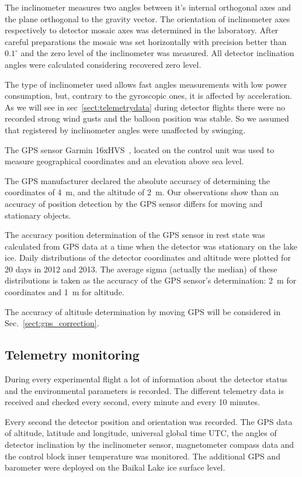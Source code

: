 \documentclass[final,5p,times,twocolumn]{elsarticle}
\begin{document}
The inclinometer measures two angles between it's internal orthogonal axes and the plane orthogonal to the gravity vector. The orientation of inclinometer axes respectively to detector mosaic axes was determined in the laboratory. After careful preparations the mosaic was set horizontally with precision better than $0.1^\circ$ and the zero level of the inclinometer was measured. All detector inclination angles were calculated considering recovered zero level.

The type of inclinometer used allows fast angles measurements with low power consumption, but, contrary to the gyroscopic ones, it is affected by acceleration. As we will see in sec~\ref{sect:telemetrydata} during detector flights there were no recorded strong wind gusts and the balloon position was stable. So we assumed that  registered by inclinometer angles were unaffected by swinging.

The GPS sensor Garmin 16xHVS~\cite{GPS-module-specs}, located on the control unit was used to measure geographical coordinates and an elevation above sea level. 

The GPS manufacturer declared the absolute accuracy of determining the coordinates of 4~m, and the altitude of 2~m. Our observations show than an accuracy of position detection by the GPS sensor differs for moving and stationary objects. 

The accuracy position determination of the GPS sensor in rest state was calculated from GPS data at a time when the detector was stationary on the lake ice. Daily distributions of the detector coordinates and altitude were plotted for 20 days in 2012 and 2013. The average sigma (actually the median) of these distributions is taken as the accuracy of the GPS sensor's determination: 2~m for coordinates and 1~m for altitude.

The accuracy of altitude determination by moving GPS will be considered in Sec.~\ref{sect:gps_correction}.

\subsection{Telemetry monitoring\label{sect:telemetry}}

During every experimental flight a lot of information about the detector status and the environmental parameters is recorded. The different telemetry data is received and checked every second, every minute and every 10 minutes. 

Every second the detector position and orientation was recorded. The GPS data of altitude, latitude and longitude, universal global time UTC, the angles of detector inclination by the inclinometer sensor, magnetometer compass data and the control block inner temperature was monitored. The additional GPS and barometer were deployed on the Baikal Lake ice surface level.
\end{document}
